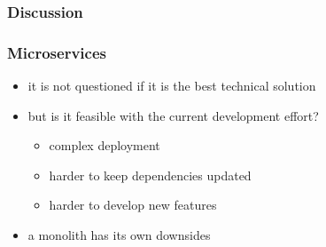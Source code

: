 \documentclass{beamer}
\begin{document}
  \begin{frame}
    \frametitle{Discussion}
    \frametitle{Microservices}

    \begin{itemize}
      \item it is not questioned if it is the best technical solution
      \item but is it feasible with the current development effort?
        \begin{itemize}
          \item complex deployment
          \item harder to keep dependencies updated
          \item harder to develop new features
        \end{itemize}
      \item a monolith has its own downsides
    \end{itemize}
  \end{frame}
\end{document}
